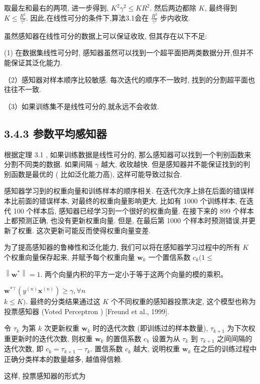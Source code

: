 \documentclass[10pt]{article}
\begin{document}
取最左和最右的两项, 进一步得到, $K^{2} \gamma^{2} \leq K R^{2}$. 然后两边都除 $K$, 最终得到 $K \leq \frac{R^{2}}{\gamma^{2}}$. 因此,在线性可分的条件下,算法3.1会在 $\frac{R^{2}}{\gamma^{2}}$ 步内收玫.

虽然感知器在线性可分的数据上可以保证收玫, 但其存在以下不足:

(1) 在数据集线性可分时, 感知器虽然可以找到一个超平面把两类数据分开,但并不能保证其泛化能力.

（2）感知器对样本顺序比较敏感. 每次迭代的顺序不一致时, 找到的分割超平面也往往不一致.

（3）如果训练集不是线性可分的,就永远不会收敛.

\subsection*{3.4.3 参数平均感知器}
根据定理 3.1 , 如果训练数据是线性可分的, 那么感知器可以找到一个判别函数来分割不同类的数据. 如果间隔 $\gamma$ 越大, 收玫越快. 但是感知器并不能保证找到的判别函数是最优的 ( 比如泛化能力高), 这样可能导致过拟合.

感知器学习到的权重向量和训练样本的顺序相关. 在迭代次序上排在后面的错误样本比前面的错误样本, 对最终的权重向量影响更大. 比如有 1000 个训练样本, 在迭代 100 个样本后, 感知器已经学习到一个很好的权重向量. 在接下来的 899 个样本上都预测正确, 也没有更新权重向量. 但是, 在最后第 1000 个样本时预测错误,并更新了权重. 这次更新可能反而使得权重向量变差.

为了提高感知器的鲁棒性和泛化能力, 我们可以将在感知器学习过程中的所有 $K$ 个权重向量保存起来, 并赋予每个权重向量 $\boldsymbol{w}_{k}$ 一个置信系数 $c_{k}(1 \leq$

$\left\|\boldsymbol{w}^{*}\right\|=1$. 两个向量内积的平方一定小于等于这两个向量的模的乘积。

$\boldsymbol{w}^{* \top}\left(y^{(n)} \boldsymbol{x}^{(n)}\right) \geq \gamma, \forall n$\\
$k \leq K)$. 最终的分类结果通过这 $K$ 个不同权重的感知器投票决定, 这个模型也称为投票感知器 (Voted Perceptron ) [Freund et al., 1999].

令 $\tau_{k}$ 为第 $k$ 次更新权重 $\boldsymbol{w}_{k}$ 时的迭代次数 (即训练过的样本数量), $\tau_{k+1}$ 为下次权重更新时的迭代次数, 则权重 $\boldsymbol{w}_{k}$ 的置信系数 $c_{k}$ 设置为从 $\tau_{k}$ 到 $\tau_{k+1}$ 之间间隔的迭代次数, 即 $c_{k}=\tau_{k+1}-\tau_{k}$. 置信系数 $c_{k}$ 越大, 说明权重 $\boldsymbol{w}_{k}$ 在之后的训练过程中正确分类样本的数量越多, 越值得信赖.

这样, 投票感知器的形式为
\end{document}

